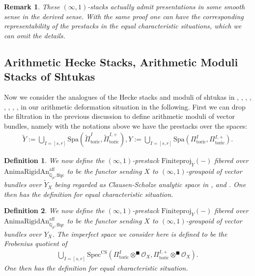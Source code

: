 \documentclass[12pt]{article}
\newtheorem{definition}{Definition}
\newtheorem{remark}{Remark}
\begin{document}
\begin{remark}
These $(\infty,1)$-stacks actually admit presentations in some smooth sense in the derived sense. With the same proof one can have the corresponding representability of the prestacks in the equal characteristic situations, which we can omit the details.
\end{remark}


\subsection{Arithmetic Hecke Stacks, Arithmetic Moduli Stacks of Shtukas}

Now we consider the analogues of the Hecke stacks and moduli of shtukas in \cite{Laff}, \cite{Dr}, \cite{Dr1}, \cite{Dr2}, \cite{SW}, \cite{RZ}, \cite{G}, \cite{A}, \cite{La} in our arithmetic deformation situation in the following. First we can drop the filtration in the previous discussion to define arithmetic moduli of vector bundles, namely with the notations above we have the prestacks over the spaces:
\begin{align}
\widetilde{Y}:=\bigcup_{I=[s,r]}\mathrm{Spa}(\widetilde{\Pi}^I_{\mathrm{toric}},\widetilde{\Pi}_{\mathrm{toric}}^{I,+}), Y:=\bigcup_{I=[s,r]}\mathrm{Spa}({\Pi}^I_{\mathrm{toric}},{\Pi}_{\mathrm{toric}}^{I,+}). 	
\end{align}


\begin{definition}
We now define the $(\infty,1)$-prestack $\mathrm{Finiteproj}_{\widetilde{Y}}(-)$ fibered over $\mathrm{AnimaRigidAn}^\mathrm{aff}_{\mathbb{Q}_p,\mathrm{ffqc}}$ to be the functor sending $X$ to $(\infty,1)$-groupoid of vector bundles over $\widetilde{Y}_X$ being regarded as Clausen-Scholze analytic space in \cite{CS1}, \cite{CS2} and \cite{CS3}. One then has the definition for equal characteristic situation. 
\end{definition}


\begin{definition}
We now define the $(\infty,1)$-prestack $\mathrm{Finiteproj}_{{Y}}(-)$ fibered over $\mathrm{AnimaRigidAn}^\mathrm{aff}_{\mathbb{Q}_p,\mathrm{ffqc}}$ to be the functor sending $X$ to $(\infty,1)$-groupoid of vector bundles over ${Y}_X$. The imperfect space we consider here is defined to be the Frobenius quotient of
\begin{align}
\bigcup_{I=[s,r]}\mathrm{Spec}^\mathrm{CS}({\Pi}^I_{\mathrm{toric}}\otimes^\blacksquare \mathcal{O}_X,{\Pi}_{\mathrm{toric}}^{I,+}\otimes^\blacksquare \mathcal{O}_X).	
\end{align}
One then has the definition for equal characteristic situation. 
\end{definition}
\end{document}
